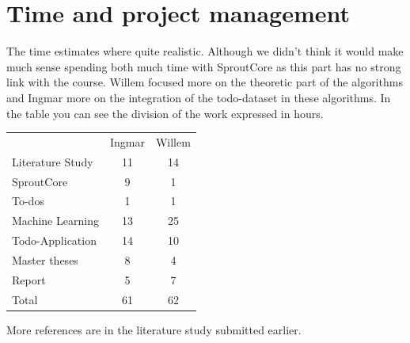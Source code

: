 \documentclass[a4paper,titlepage]{article}
\begin{document}
\section{Time and project management}
The time estimates where quite realistic. Although we didn't think it would make much sense spending both much time with SproutCore as this part has no strong link with the course. Willem focused more on the theoretic part of the algorithms and Ingmar more on the integration of the todo-dataset in these algorithms. In the table you can see the division of the work expressed in hours.
\begin{table}[H]
\centering
\begin{tabular}{lcc}
&Ingmar&Willem \\
Literature Study & 11 & 14\\
SproutCore & 9 & 1\\
To-dos & 1 & 1\\
Machine Learning & 13 & 25\\
Todo-Application & 14 & 10 \\
Master theses & 8 & 4\\
Report & 5 & 7\\
\hline
Total & 61 & 62
\end{tabular}
\end{table}

\nocite{*}


More references are in the literature study submitted earlier.
\end{document}
